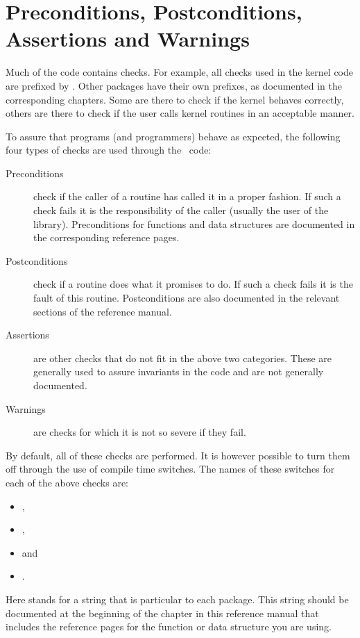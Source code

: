 

\section{Preconditions, Postconditions, Assertions and Warnings}
\label{sec:checks}

Much of the {\cgal} code contains checks. 
For example, all checks used in the kernel code are prefixed by 
.
Other packages have their own prefixes, as documented in the corresponding
chapters.
Some are there to check if the kernel behaves correctly, others are there to 
check if the user calls kernel routines in an acceptable manner.

To assure that programs (and programmers) behave as expected, 
the following four types of checks are used through the \cgal\ code:
\begin{description}
\item[Preconditions] check if the caller of a routine has called it in a
proper fashion. If such a check fails it is the responsibility of the caller 
(usually the user of the library).  Preconditions for functions and data
structures are documented in the corresponding reference pages.
\item[Postconditions] check if a routine does what it promises to do. 
If such a check fails it is the fault of this routine.  Postconditions
are also documented in the relevant sections of the reference manual.
\item[Assertions] are other checks that do not fit in the above two 
categories.  These are generally used to assure invariants in the
code and are not generally documented.
\item[Warnings] are checks for which it is not so severe if they fail.
\end{description}

By default, all of these checks are performed. 
It is however possible to turn them off through the use of compile time 
switches.  The names of these switches for each of the above checks
are:
\begin{itemize}
  \item {}, 
  \item {},
  \item {} and 
  \item {}.
\end{itemize}
Here  stands for a string that is particular to each
package.  This string should be documented at the beginning of the
chapter in this reference manual that includes the reference pages 
for the function or data structure you are using.

